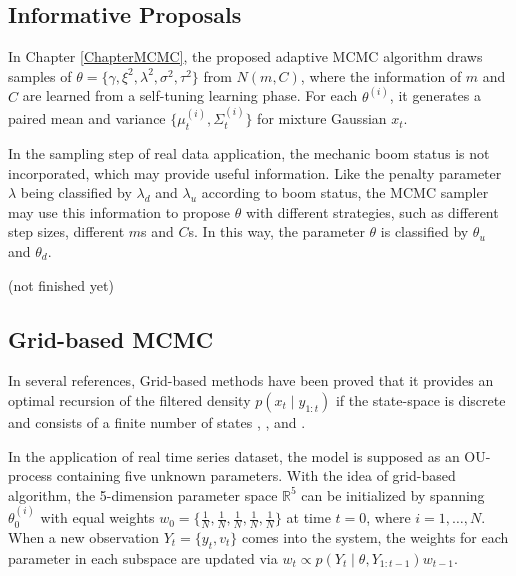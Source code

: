 \subsection*{Informative Proposals}

In Chapter \ref{ChapterMCMC}, the proposed adaptive MCMC algorithm draws samples of $\theta=\{\gamma,\xi^2,\lambda^2,\sigma^2,\tau^2\}$ from $N(m,C)$, where the information of $m$ and $C$ are learned from a self-tuning learning phase. For each $\theta^{(i)}$, it generates a paired mean and variance $\{\mu_t^{(i)},\Sigma_t^{(i)}\}$ for mixture Gaussian $x_t$. 

In the sampling step of real data application, the mechanic boom status is not incorporated, which may provide useful information. Like the penalty parameter $\lambda$ being classified by $\lambda_d$ and $\lambda_u$ according to boom status, the MCMC sampler may use this information to propose $\theta$ with different strategies, such as different step sizes, different $m$s and $C$s. In this way, the parameter $\theta$ is classified by $\theta_u$ and $\theta_d$. 

(not finished yet)



\subsection*{Grid-based MCMC}

In several references, Grid-based methods have been proved that it provides an optimal recursion of the filtered density $p(x_t\mid y_{1:t})$ if the state-space is discrete and consists of a finite number of states \cite{ristic2004beyond}, \cite{stroud2016bayesian}, \cite{arulampalam2002tutorial} and \cite{hartmann2016grid}. 

In the application of real time series dataset, the model is supposed as an OU-process containing five unknown parameters. With the idea of grid-based algorithm, the 5-dimension parameter space $\mathbb{R}^5$ can be initialized by spanning $\theta_0^{(i)}$ with equal weights $w_0=\{\frac{1}{N},\frac{1}{N},\frac{1}{N},\frac{1}{N},\frac{1}{N}\}$ at time $t=0$, where $i=1,\ldots,N$. When a new observation $Y_t=\{y_t,v_t\}$ comes into the system, the weights for each parameter in each subspace are updated via $w_t\propto p(Y_t\mid \theta,Y_{1:t-1})w_{t-1}$. 

